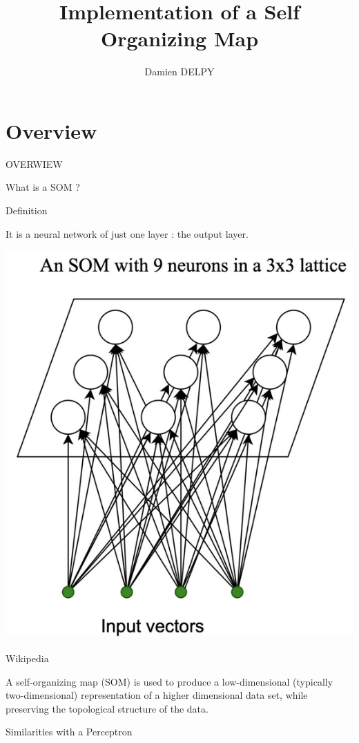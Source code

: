 \documentclass{beamer}
\author{Damien DELPY}
\title{Implementation of a Self Organizing Map}
\institute{ENSEIRB-MATMECA}
\begin{document}
\begin{frame}
	
	\titlepage
\end{frame}


\begin{frame}

	\tableofcontents[sectionstyle=show,subsectionstyle=show/shaded/hide,subsectionstyle=show/shaded/hide]
\end{frame}



\section{Overview}
	
	\begin{frame}

		\begin{center}
			
			\Huge OVERWIEW
		\end{center}
	\end{frame}


	\begin{frame}{What is a SOM ?}
		
		\begin{block}{Definition}
 
It is a neural network of just one layer : the output layer.
 	
			
		\centering
			\includegraphics[width=0.3\linewidth]{pics/som_example_diapo_1.png}
		\end{block}		

		\begin{block}{Wikipedia}

A self-organizing map (SOM) is used to produce a low-dimensional (typically two-dimensional) representation of a higher dimensional data set, while preserving the topological structure of the data. 
		\end{block}
	\end{frame}
	
	
	\begin{frame}{Similarities with a Perceptron}

	\end{frame}
	
\end{document}
